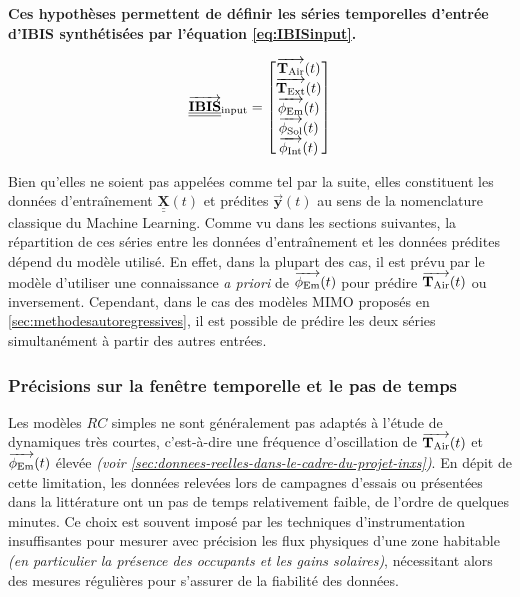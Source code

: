         \textbf{Ces hypothèses permettent de définir les séries temporelles d'entrée d'IBIS synthétisées par l'équation \ref{eq:IBISinput}.}

        \begin{equation}
            \overrightarrow{\underline{\underline{\textbf{IBIS}}}}_{\text{input}} =
            \begin{bmatrix}
                \operatorname{\overrightarrow{\mathbf{T}_{\text{Air}}}}(t)\\
                \operatorname{\overrightarrow{\mathbf{T}_{\text{Ext}}}}(t)\\
                \operatorname{\overrightarrow{\mathbf{\phi}_{\text{Em}}}}(t)\\
                \operatorname{\overrightarrow{\phi_{\text{Sol}}}}(t)\\
                \operatorname{\overrightarrow{\phi_{\text{Int}}}}(t)
            \end{bmatrix}\label{eq:IBISinput}
        \end{equation}

        \begin{bluebox}

            Bien qu'elles ne soient pas appelées comme tel par la suite, elles constituent les données d'entraînement $\underline{\underline{\mathbf X}}(t)$ et prédites $\overrightarrow{\mathbf y} (t)$ au sens de la nomenclature classique du Machine Learning.
            Comme vu dans les sections suivantes, la répartition de ces séries entre les données d'entraînement et les données prédites dépend du modèle utilisé.
            En effet, dans la plupart des cas, il est prévu par le modèle d'utiliser une connaissance \textit{a priori} de $\operatorname{\overrightarrow{\mathbf{\phi}_{\text{Em}}}}(t)$ pour prédire $\operatorname{\overrightarrow{\mathbf{T}_{\text{Air}}}}(t)$ ou inversement.
            Cependant, dans le cas des modèles MIMO proposés en \ref{sec:methodesautoregressives}, il est possible de prédire les deux séries simultanément à partir des autres entrées.
        \end{bluebox}

        \subsubsection{Précisions sur la fenêtre temporelle et le pas de temps}
            Les modèles $RC$ simples ne sont généralement pas adaptés à l'étude de dynamiques très courtes, c'est-à-dire une fréquence d'oscillation de $\operatorname{\overrightarrow{\mathbf{T}_{\text{Air}}}}(t)$ et $\operatorname{\overrightarrow{\mathbf{\phi}_{\text{Em}}}}(t)$ élevée \textit{(voir \ref{sec:donnees-reelles-dans-le-cadre-du-projet-inxs})}.
            En dépit de cette limitation, les données relevées lors de campagnes d'essais ou présentées dans la littérature ont un pas de temps relativement faible, de l'ordre de quelques minutes.
            Ce choix est souvent imposé par les techniques d'instrumentation insuffisantes pour mesurer avec précision les flux physiques d'une zone habitable \textit{(en particulier la présence des occupants et les gains solaires)}, nécessitant alors des mesures régulières pour s'assurer de la fiabilité des données.

